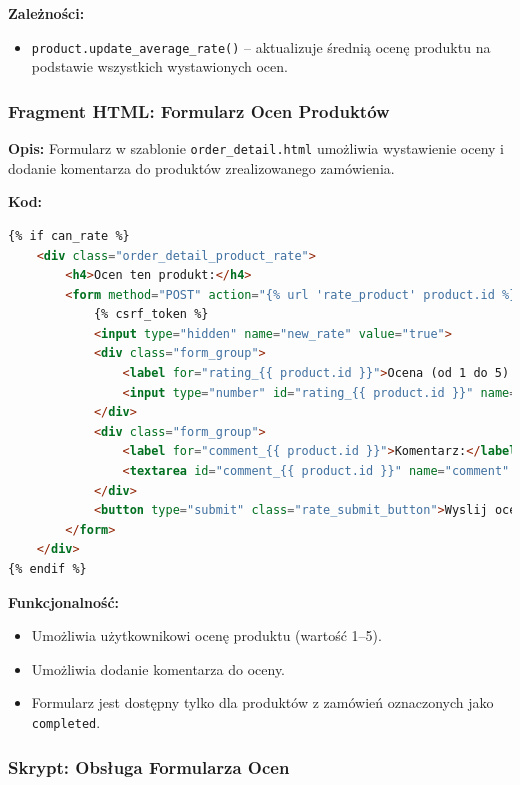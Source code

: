 \documentclass[12pt,a4paper,oneside]{article}
\theoremstyle{definition}
\numberwithin{equation}{section}
\begin{document}
\textbf{Zależności:}
\begin{itemize}
    \item \texttt{product.update\_average\_rate()} – aktualizuje średnią ocenę produktu na podstawie wszystkich wystawionych ocen.
\end{itemize}

\subsubsection{Fragment HTML: Formularz Ocen Produktów}

\textbf{Opis:}  
Formularz w szablonie \texttt{order\_detail.html} umożliwia wystawienie oceny i dodanie komentarza do produktów zrealizowanego zamówienia.

\textbf{Kod:}
\begin{lstlisting}[language=HTML]
{% if can_rate %}
    <div class="order_detail_product_rate">
        <h4>Ocen ten produkt:</h4>
        <form method="POST" action="{% url 'rate_product' product.id %}" class="rating_form">
            {% csrf_token %}
            <input type="hidden" name="new_rate" value="true">
            <div class="form_group">
                <label for="rating_{{ product.id }}">Ocena (od 1 do 5):</label>
                <input type="number" id="rating_{{ product.id }}" name="value" min="1" max="5" required>
            </div>
            <div class="form_group">
                <label for="comment_{{ product.id }}">Komentarz:</label>
                <textarea id="comment_{{ product.id }}" name="comment" rows="3"></textarea>
            </div>
            <button type="submit" class="rate_submit_button">Wyslij ocene</button>
        </form>
    </div>
{% endif %}
\end{lstlisting}

\textbf{Funkcjonalność:}
\begin{itemize}
    \item Umożliwia użytkownikowi ocenę produktu (wartość 1–5).
    \item Umożliwia dodanie komentarza do oceny.
    \item Formularz jest dostępny tylko dla produktów z zamówień oznaczonych jako \texttt{completed}.
\end{itemize}




\subsubsection{Skrypt: Obsługa Formularza Ocen}
\end{document}
